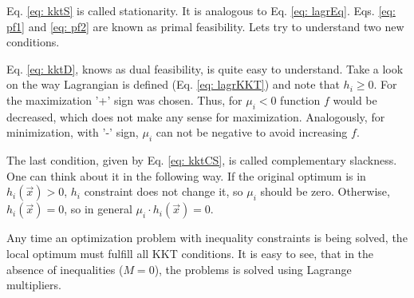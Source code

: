 Eq. \ref{eq: kktS} is called stationarity. It is analogous to Eq. \ref{eq: lagrEq}. Eqs. \ref{eq: pf1} and \ref{eq: pf2} are known as primal feasibility. Lets try to understand two new conditions. 

Eq. \ref{eq: kktD}, knows as dual feasibility, is quite easy to understand. Take a look on the way Lagrangian is defined (Eq. \ref{eq: lagrKKT}) and note that $h_i \geq 0$. For the maximization '+' sign was chosen. Thus, for $\mu_i < 0$ function $f$ would be decreased, which does not make any sense for maximization. Analogously, for minimization, with '-' sign, $\mu_i$ can not be negative to avoid increasing $f$.

The last condition, given by Eq. \ref{eq: kktCS}, is called complementary slackness. One can think about it in the following way. If the original optimum is in $h_i(\vec x) > 0$, $h_i$ constraint does not change it, so $\mu_i$ should be zero. Otherwise, $h_i (\vec x) = 0$, so in general $\mu_i \cdot h_i (\vec x) = 0$.

Any time an optimization problem with inequality constraints is being solved, the local optimum must fulfill all KKT conditions. It is easy to see, that in the absence of inequalities ($M = 0$), the problems is solved using Lagrange multipliers.


